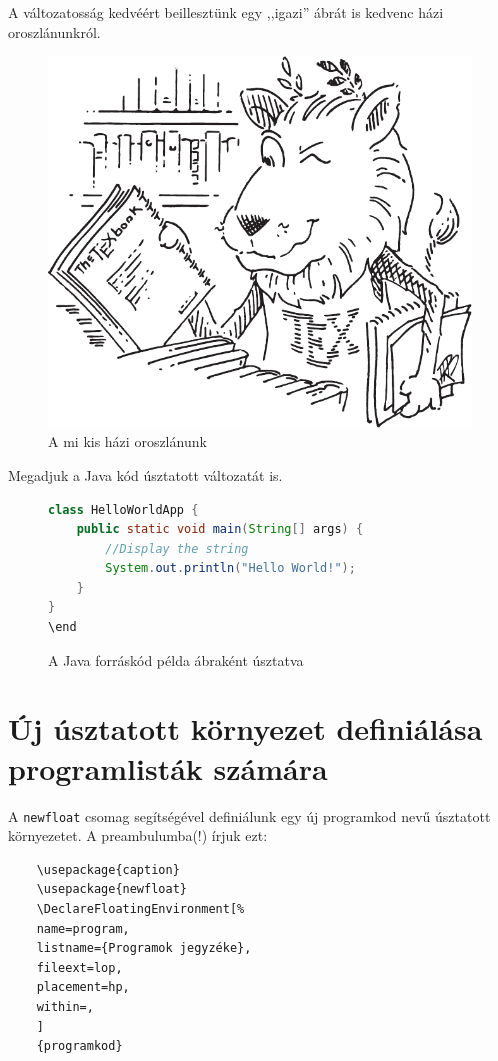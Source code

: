 \documentclass{article}
\begin{document}
  A változatosság kedvéért beillesztünk egy ,,igazi'' ábrát is kedvenc házi oroszlánunkról.
\begin{figure}[!h]
\centering
\includegraphics[scale=0.5]{Lion.pdf}
\caption{A mi kis házi oroszlánunk}
\end{figure}

  Megadjuk a   Java kód úsztatott változatát is.

\begin{figure}[!h]
{\centering
\begin{lstlisting}[language=Java, frame=shadowbox]
class HelloWorldApp {
    public static void main(String[] args) {
        //Display the string
        System.out.println("Hello World!");
    }
}
\end
\end{lstlisting}
\caption{A   Java forráskód példa ábraként úsztatva}
}
\end{figure}


\section{Új úsztatott környezet definiálása programlisták számára}
A  \verb!newfloat! csomag segítségével definiálunk egy új programkod nevű úsztatott környezetet. A preambulumba(!) írjuk ezt:
\begin{verbatim}
	\usepackage{caption}
	\usepackage{newfloat}
	\DeclareFloatingEnvironment[%
	name=program,
	listname={Programok jegyzéke},
	fileext=lop,
	placement=hp,
	within=,
	]
	{programkod}
\end{verbatim}
\end{document}
